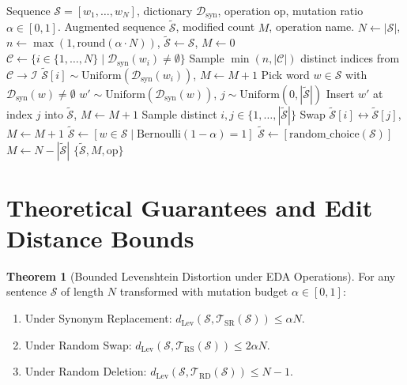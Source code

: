 \documentclass[11pt,a4paper]{article}
\theoremstyle{definition}
\newtheorem{theorem}{Theorem}[section]
\begin{document}
\begin{algorithm}[H]
\caption{Discrete Text Data Augmentation Pipeline}
\label{alg:text_aug}
\begin{algorithmic}[1]
\Require Sequence $\mathcal{S} = [w_1, \dots, w_N]$, dictionary $\mathcal{D}_{\text{syn}}$, operation $\text{op}$, mutation ratio $\alpha \in [0, 1]$.
\Ensure Augmented sequence $\tilde{\mathcal{S}}$, modified count $M$, operation name.
\State $N \gets |\mathcal{S}|$, $n \gets \max(1, \text{round}(\alpha \cdot N))$, $\tilde{\mathcal{S}} \gets \mathcal{S}$, $M \gets 0$
    \State $\mathcal{C} \gets \{i \in \{1, \dots, N\} \mid \mathcal{D}_{\text{syn}}(w_i) \ne \emptyset\}$
    \State Sample $\min(n, |\mathcal{C}|)$ distinct indices from $\mathcal{C} \to \mathcal{I}$
        \State $\tilde{\mathcal{S}}[i] \sim \text{Uniform}(\mathcal{D}_{\text{syn}}(w_i))$, $M \gets M + 1$
    \EndFor
{}
        \State Pick word $w \in \mathcal{S}$ with $\mathcal{D}_{\text{syn}}(w) \ne \emptyset$
        \State $w' \sim \text{Uniform}(\mathcal{D}_{\text{syn}}(w))$, $j \sim \text{Uniform}(0, |\tilde{\mathcal{S}}|)$
        \State Insert $w'$ at index $j$ into $\tilde{\mathcal{S}}$, $M \gets M + 1$
    \EndFor
{}
        \State Sample distinct $i, j \in \{1, \dots, |\tilde{\mathcal{S}}|\}$
        \State Swap $\tilde{\mathcal{S}}[i] \leftrightarrow \tilde{\mathcal{S}}[j]$, $M \gets M + 1$
    \EndFor
{}
    \State $\tilde{\mathcal{S}} \gets [w \in \mathcal{S} \mid \text{Bernoulli}(1 - \alpha) = 1]$
        \State $\tilde{\mathcal{S}} \gets [\text{random\_choice}(\mathcal{S})]$
    \EndIf
    \State $M \gets N - |\tilde{\mathcal{S}}|$
\EndIf
\State \Return $\{\tilde{\mathcal{S}}, M, \text{op}\}$
\end{algorithmic}
\end{algorithm}

\section{Theoretical Guarantees and Edit Distance Bounds}

\begin{theorem}[Bounded Levenshtein Distortion under EDA Operations]
For any sentence $\mathcal{S}$ of length $N$ transformed with mutation budget $\alpha \in [0, 1]$:
\begin{enumerate}
    \item Under Synonym Replacement: $d_{\text{Lev}}(\mathcal{S}, \mathcal{T}_{\text{SR}}(\mathcal{S})) \le \alpha N$.
    \item Under Random Swap: $d_{\text{Lev}}(\mathcal{S}, \mathcal{T}_{\text{RS}}(\mathcal{S})) \le 2 \alpha N$.
    \item Under Random Deletion: $d_{\text{Lev}}(\mathcal{S}, \mathcal{T}_{\text{RD}}(\mathcal{S})) \le N - 1$.
\end{enumerate}
\end{theorem}
\end{document}
